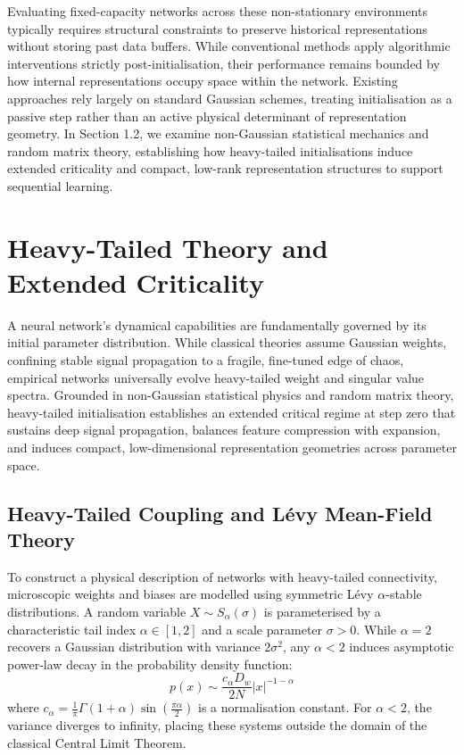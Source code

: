 \documentclass[11pt,oneside]{report}
\begin{document}
Evaluating fixed-capacity networks across these non-stationary environments typically requires structural constraints to preserve historical representations without storing past data buffers. While conventional methods apply algorithmic interventions strictly post-initialisation, their performance remains bounded by how internal representations occupy space within the network. Existing approaches rely largely on standard Gaussian schemes, treating initialisation as a passive step rather than an active physical determinant of representation geometry. In Section 1.2, we examine non-Gaussian statistical mechanics and random matrix theory, establishing how heavy-tailed initialisations induce extended criticality and compact, low-rank representation structures to support sequential learning.
\section{Heavy-Tailed Theory and Extended Criticality}
A neural network's dynamical capabilities are fundamentally governed by its initial parameter distribution. While classical theories assume Gaussian weights, confining stable signal propagation to a fragile, fine-tuned edge of chaos, empirical networks universally evolve heavy-tailed weight and singular value spectra. Grounded in non-Gaussian statistical physics and random matrix theory, heavy-tailed initialisation establishes an extended critical regime at step zero that sustains deep signal propagation, balances feature compression with expansion, and induces compact, low-dimensional representation geometries across parameter space.

\subsection{Heavy-Tailed Coupling and L{\'e}vy Mean-Field Theory}
To construct a physical description of networks with heavy-tailed connectivity, microscopic weights and biases are modelled using symmetric L{\'e}vy $\alpha$-stable distributions. A random variable $X \sim S_\alpha(\sigma)$ is parameterised by a characteristic tail index $\alpha \in [1, 2]$ and a scale parameter $\sigma > 0$. While $\alpha = 2$ recovers a Gaussian distribution with variance $2\sigma^2$, any $\alpha < 2$ induces asymptotic power-law decay in the probability density function:
\begin{equation}
	p(x) \sim \frac{c_\alpha D_w}{2N}|x|^{-1-\alpha}
\end{equation}
where $c_\alpha = \frac{1}{\pi} \Gamma(1+\alpha)\sin\left(\frac{\pi\alpha}{2}\right)$ is a normalisation constant. For $\alpha < 2$, the variance diverges to infinity, placing these systems outside the domain of the classical Central Limit Theorem.
\end{document}
